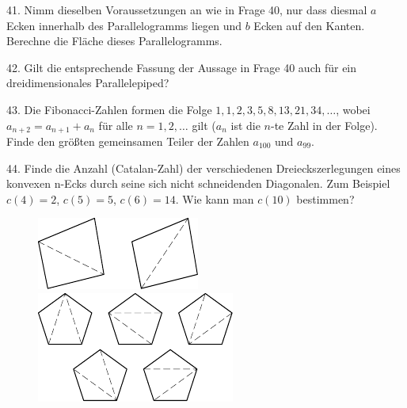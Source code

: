 \begin{problem}{41.}
	Nimm dieselben Voraussetzungen an wie in Frage 40, nur dass diesmal $a$ Ecken innerhalb des Parallelogramms liegen und $b$ Ecken auf den Kanten. Berechne die Fläche dieses Parallelogramms.
\end{problem}

\begin{problem}{42.}
	Gilt die entsprechende Fassung der Aussage in Frage 40 auch für ein dreidimensionales Parallelepiped?
\end{problem}

\begin{problem}{43.}
	Die Fibonacci-Zahlen formen die Folge $1,1,2,3,5,8,13,21,34,\allowbreak\dotsc$, wobei $a_{n+2}=a_{n+1}+a_n$ für alle
	$n=1,2,\dotsc$ gilt ($a_n$ ist die $n$-te Zahl in der Folge). Finde den größten gemeinsamen Teiler der Zahlen $a_{100}$ und $a_{99}$.
\end{problem}

\begin{problem}{44.}
	Finde die Anzahl (Catalan-Zahl) der verschiedenen Dreieckszerlegungen eines konvexen n-Ecks durch seine sich nicht schneidenden Diagonalen.
	Zum Beispiel $c(4)=2$, $c(5)=5$, $c(6)=14$. Wie kann man $c(10)$ bestimmen?
	\begin{figure}
		\includegraphics{taskbook-281}
		\qquad
		\includegraphics{taskbook-282}
	\end{figure}
\end{problem}

